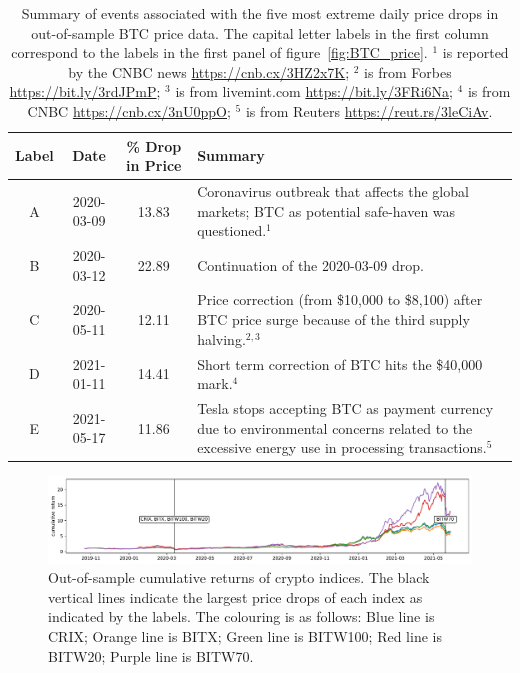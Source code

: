 \begin{table}[!h]
    \centering
      \begin{tabularx}{.8\textwidth}{cccX}
        \toprule
        Label &   Date & \% Drop in Price &  Summary\\
        \midrule
        A &  2020-03-09 & 13.83 &  Coronavirus outbreak that affects
        the global markets; BTC as potential safe-haven was
        questioned.$^1$\\ 
        B &  2020-03-12 & 22.89 &  Continuation of the 2020-03-09
        drop.  \\ 
        C &  2020-05-11 & 12.11 &  Price correction (from \$10,000 to
        \$8,100) after BTC price surge because of the third supply
        halving.$^{2,3}$ \\ 
        D &  2021-01-11 & 14.41 &  Short term correction of BTC hits
        the \$40,000 mark.$^4$\\ 
        E &  2021-05-17 & 11.86 &  Tesla stops accepting BTC as
        payment currency due to environmental concerns related to the
        excessive energy use in processing transactions.$^5$\\ 
        \bottomrule
      \end{tabularx}
        \caption{Summary of events associated with the five most
          extreme daily price drops in out-of-sample BTC price data. 
        The capital letter labels in the first column correspond to
        the labels in the first panel of figure~\ref{fig:BTC_price}. 
        $^1$ is reported by the CNBC news \url{https://cnb.cx/3HZ2x7K}; $^2$ is from Forbes \url{https://bit.ly/3rdJPmP};
        $^3$ is from livemint.com \url{https://bit.ly/3FRi6Na};
        $^4$ is from CNBC \url{https://cnb.cx/3nU0ppO};
        $^5$ is from Reuters \url{https://reut.rs/3leCiAv}.
        }
        \label{tab:BTC_5min}
  \end{table}
\clearpage
\newpage
\begin{figure}[t]
\includegraphics[width=\textwidth]{_pics/index_price.pdf}
  \caption{Out-of-sample cumulative returns of crypto indices. 
  The black vertical lines indicate the largest price drops of each
  index as indicated by the labels.
  The colouring is as follows:
  \textcolor{plt1}{Blue line} is CRIX;
  \textcolor{plt2}{Orange line} is BITX;
  \textcolor{plt3}{Green line} is BITW100;
  \textcolor{plt4}{Red line} is BITW20;
  \textcolor{plt5}{Purple line} is BITW70.
  }
\label{fig:index_price}
\end{figure}

